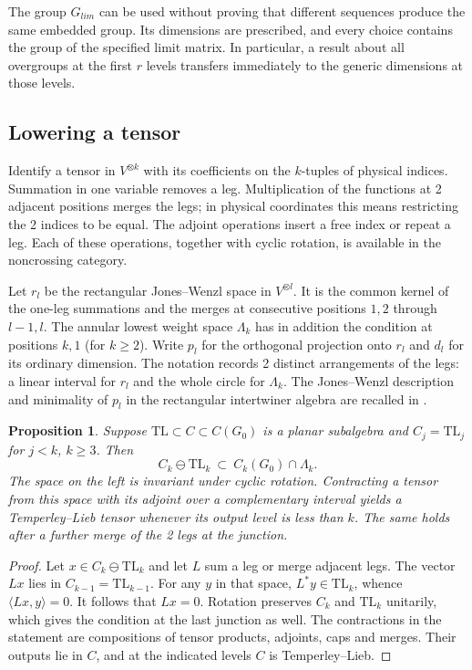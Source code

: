 \documentclass[11pt,a4paper]{amsart}
\newtheorem{proposition}[theorem]{Proposition}
\newcommand{\TL}{\mathrm{TL}}
\begin{document}
The group $G_{lim}$ can be used without proving that different sequences produce the same embedded group. Its dimensions are prescribed, and every choice contains the group of the specified limit matrix. In particular, a result about all overgroups at the first $r$ levels transfers immediately to the generic dimensions at those levels.

\subsection{Lowering a tensor}
Identify a tensor in $V^{\otimes k}$ with its coefficients on the $k$-tuples of physical indices. Summation in one variable removes a leg. Multiplication of the functions at 2 adjacent positions merges the legs; in physical coordinates this means restricting the 2 indices to be equal. The adjoint operations insert a free index or repeat a leg. Each of these operations, together with cyclic rotation, is available in the noncrossing category.

Let $r_l$ be the rectangular Jones--Wenzl space in $V^{\otimes l}$. It is the common kernel of the one-leg summations and the merges at consecutive positions $1,2$ through $l-1,l$. The annular lowest weight space $\Lambda_k$ has in addition the condition at positions $k,1$ (for $k\geq2$). Write $p_l$ for the orthogonal projection onto $r_l$ and $d_l$ for its ordinary dimension. The notation records 2 distinct arrangements of the legs: a linear interval for $r_l$ and the whole circle for $\Lambda_k$. The Jones--Wenzl description and minimality of $p_l$ in the rectangular intertwiner algebra are recalled in \cite[Section 9]{bo}.

\begin{proposition}\label{prop:lw}
Suppose $\TL\subset C\subset C(G_0)$ is a planar subalgebra and $C_j=\TL_j$ for $j<k$, $k\geq3$. Then
\[
 C_k\ominus\TL_k\ \subset\ C_k(G_0)\cap\Lambda_k .
\]
The space on the left is invariant under cyclic rotation. Contracting a tensor from this space with its adjoint over a complementary interval yields a Temperley--Lieb tensor whenever its output level is less than $k$. The same holds after a further merge of the 2 legs at the junction.
\end{proposition}
\begin{proof}
Let $x\in C_k\ominus\TL_k$ and let $L$ sum a leg or merge adjacent legs. The vector $Lx$ lies in $C_{k-1}=\TL_{k-1}$. For any $y$ in that space, $L^*y\in\TL_k$, whence $\langle Lx,y\rangle=0$. It follows that $Lx=0$. Rotation preserves $C_k$ and $\TL_k$ unitarily, which gives the condition at the last junction as well. The contractions in the statement are compositions of tensor products, adjoints, caps and merges. Their outputs lie in $C$, and at the indicated levels $C$ is Temperley--Lieb.
\end{proof}
\end{document}
